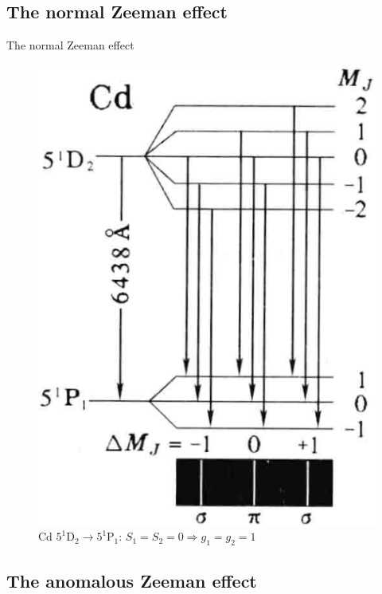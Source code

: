 \subsection{The normal Zeeman effect}

\begin{frame}{The normal Zeeman effect}
    \begin{figure}
        \centering
        \includegraphics[scale=0.6]{fig/fig 5.14.png}
        \caption{Cd $5^1$D$_2\to5^1$P$_1:\,S_1=S_2=0\Rightarrow g_1=g_2=1$}
    \end{figure}
\end{frame}

\subsection{The anomalous Zeeman effect}

